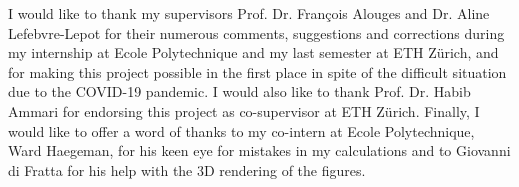 I would like to thank my supervisors Prof. Dr. François Alouges and Dr. Aline Lefebvre-Lepot for their numerous comments, suggestions and corrections during my internship at Ecole Polytechnique and my last semester at ETH Zürich, and for making this project possible in the first place in spite of the difficult situation due to the COVID-19 pandemic. I would also like to thank Prof. Dr. Habib Ammari for endorsing this project as co-supervisor at ETH Zürich. Finally, I would like to offer a word of thanks to my co-intern at Ecole Polytechnique, Ward Haegeman, for his keen eye for mistakes in my calculations and to Giovanni di Fratta for his help with the 3D rendering of the figures.